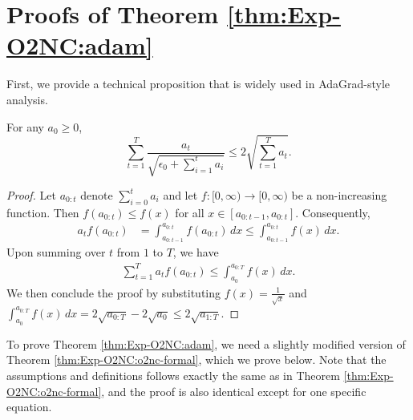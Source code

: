 \section{Proofs of Theorem \ref{thm:Exp-O2NC:adam}}

First, we provide a technical proposition that is widely used in AdaGrad-style analysis.

\begin{proposition}
\label{prop:Exp-O2NC:tech-adagrad}
For any $a_0\ge 0$,
\begin{equation*}
    \sum_{t=1}^T \frac{a_t}{\sqrt{\epsilon_0+\sum_{i=1}^t a_i}} 
    \le 2\sqrt{\sum_{t=1}^T a_t}.
\end{equation*}
\end{proposition}

\begin{proof}
Let $a_{0:t}$ denote $\sum_{i=0}^t a_i$ and let $f:[0,\infty)\to [0,\infty)$ be a non-increasing function. Then $f(a_{0:t}) \le f(x)$ for all $x\in [a_{0:t-1},a_{0:t}]$. Consequently,
\begin{align*}
    a_t f(a_{0:t})
    &= \int_{a_{0:t-1}}^{a_{0:t}} f(a_{0:t}) \, dx
    \le \int_{a_{0:t-1}}^{a_{0:t}} f(x) \, dx.
\end{align*}
Upon summing over $t$ from $1$ to $T$, we have
\begin{align*}
    \sum_{t=1}^T a_t f(a_{0:t}) \le \int_{a_0}^{a_{0:T}} f(x) \,dx.
\end{align*}
We then conclude the proof by substituting $f(x) = \frac{1}{\sqrt{x}}$ and $\int_{a_0}^{a_{0:T}} f(x)\, dx = 2\sqrt{a_{0:T}}-2\sqrt{a_0} \le 2\sqrt{a_{1:T}}$.
\end{proof}


To prove Theorem \ref{thm:Exp-O2NC:adam}, we need a slightly modified version of Theorem \ref{thm:Exp-O2NC:o2nc-formal}, which we prove below. Note that the assumptions and definitions follows exactly the same as in Theorem \ref{thm:Exp-O2NC:o2nc-formal}, and the proof is also identical except for one specific equation.

